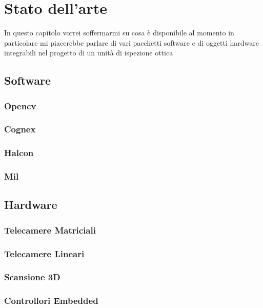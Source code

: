 \chapter{Stato dell'arte}
In questo capitolo vorrei soffermarmi su cosa è disponibile al momento
in particolare mi piacerebbe parlare di vari pacchetti software e di oggetti
hardware integrabili nel progetto di un unità di ispezione ottica

\section{Software}
\subsection{Opencv}
\subsection{Cognex}
\subsection{Halcon}
\subsection{Mil}

\section{Hardware}
\subsection{Telecamere Matriciali}
\subsection{Telecamere Lineari}
\subsection{Scansione 3D}
\subsection{Controllori Embedded}